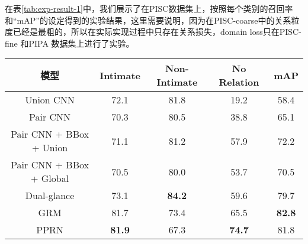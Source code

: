 在表\ref{tab:exp-result-1}中，我们展示了在PISC数据集上，按照每个类别的召回率和``mAP''的设定得到的实验结果，这里需要说明，因为在PISC-coarse中的关系粒度已经是最粗的，所以在实际实现过程中只存在关系损失，domain loss只在PISC-fine 和PIPA 数据集上进行了实验。
\begin{table*}[htpb]
  \centering
  \caption{在PISC-coarse上的实验结果，单位为百分比(\%)}
  \label{tab:exp-result-1}
  \begin{tabular}{c|c|c|c|c}
    \toprule
    模型 & Intimate & Non-Intimate & No Relation & mAP  \\
    \midrule
    Union CNN \cite{lu2016visual} & 72.1 & 81.8 & 19.2 & 58.4   \\
    \midrule
    Pair CNN \cite{li2017dual-glance}  & 70.3 & 80.5 & 38.8 & 65.1   \\
    \midrule
    Pair CNN + BBox + Union \cite{li2017dual-glance}  & 71.1 & 81.2 & 57.9 & 72.2   \\
    \midrule
    Pair CNN + BBox + Global \cite{li2017dual-glance}  & 70.5 & 80.0 & 53.7 & 70.5  \\
    \midrule
    Dual-glance \cite{li2017dual-glance} & 73.1 & \textbf{84.2} & 59.6 & 79.7  \\
    \midrule
    GRM \cite{wang2018deep} & 81.7 & 73.4 & 65.5 & \textbf{82.8}   \\
    \midrule
    PPRN & \textbf{81.9} & 67.3 & \textbf{74.7} & 81.8  \\
    \midrule
  \end{tabular}
\end{table*}

